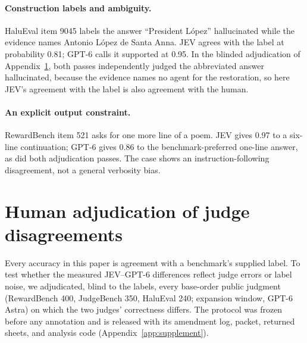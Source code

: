 \documentclass[11pt]{article}
\begin{document}
\paragraph{Construction labels and ambiguity.}
HaluEval item 9045 labels the answer ``President L\'{o}pez'' hallucinated while the evidence names Antonio L\'{o}pez de Santa Anna. JEV agrees with the label at probability 0.81; GPT-6 calls it supported at 0.95. In the blinded adjudication of Appendix~\ref{app:human}, both passes independently judged the abbreviated answer hallucinated, because the evidence names no agent for the restoration, so here JEV's agreement with the label is also agreement with the human.
\paragraph{An explicit output constraint.}
RewardBench item 521 asks for one more line of a poem. JEV gives 0.97 to a six-line continuation; GPT-6 gives 0.86 to the benchmark-preferred one-line answer, as did both adjudication passes. The case shows an instruction-following disagreement, not a general verbosity bias.

\FloatBarrier

\section{Human adjudication of judge disagreements}
\label{app:human}
Every accuracy in this paper is agreement with a benchmark's supplied label. To test whether the measured JEV--GPT-6 differences reflect judge errors or label noise, we adjudicated, blind to the labels, every base-order public judgment (RewardBench 400, JudgeBench 350, HaluEval 240; expansion window, GPT-6 Astra) on which the two judges' correctness differs. The protocol was frozen before any annotation and is released with its amendment log, packet, returned sheets, and analysis code (Appendix~\ref{app:supplement}).

\begin{apptable}
\centering\footnotesize\setlength{\tabcolsep}{5pt}

\caption{Human adjudication of the items on which JEV and GPT-6 differ. $\kappa$: Cohen's $\kappa$ between the human annotator and the LLM rater on the collapsed decision, before adjudication. S3: control items whose final human label equals the benchmark label. S2: both-wrong items whose human label confirms the benchmark label, confirms the judges' shared decision, or is indecisive. S1: disagreement items on which the human sides with JEV, with GPT-6, or is indecisive. $\Delta$: JEV-minus-GPT-6 accuracy difference in points over all items of the task, on benchmark labels and under human labels, with a 95\% source-cluster bootstrap interval. Corrected: accuracy (\%) with benchmark labels replaced by decisive human labels on adjudicated items only.}
\label{tab:human}
\end{apptable}
\end{document}

